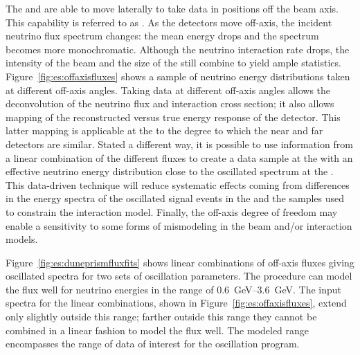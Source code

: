 The  and  %
are able to move laterally to take data in positions off the beam axis.  This capability is referred to as . As the detectors move off-axis, the incident neutrino flux spectrum changes:    the mean energy drops and the spectrum becomes more monochromatic.  Although the neutrino interaction rate drops, the intensity of the beam and the size of the  still combine to yield ample statistics. %
Figure~\ref{fig:es:offaxisfluxes} shows a sample of neutrino energy distributions taken at different off-axis angles.
%
Taking data at different off-axis angles allows the deconvolution of the neutrino flux and interaction cross section; it also allows mapping of the reconstructed versus true energy response of the detector.  This latter mapping is applicable at the  to the degree to which the near and far  detectors are similar.  Stated a different way, it is possible to use information from a linear combination of the different fluxes to create a data sample at the  with an effective neutrino energy distribution close to the oscillated spectrum at the .  This data-driven technique will reduce systematic effects coming from differences in the energy spectra of the oscillated signal events in the  and the  samples used to constrain the interaction model. Finally, the off-axis degree of freedom may enable a sensitivity to some forms of mismodeling in the beam and/or interaction models. %

Figure~\ref{fig:es:duneprismfluxfits} shows linear combinations of off-axis fluxes giving  oscillated spectra for two sets of oscillation parameters. The procedure can model the  flux well for neutrino energies in the range of \SIrange{0.6}{3.6}{GeV}. The input spectra for the linear combinations, shown in Figure~\ref{fig:es:offaxisfluxes}, extend only slightly outside this range; farther outside this range they cannot be combined in a linear fashion to model the flux well. %
The modeled range encompasses the range of data of interest for the oscillation program.   


